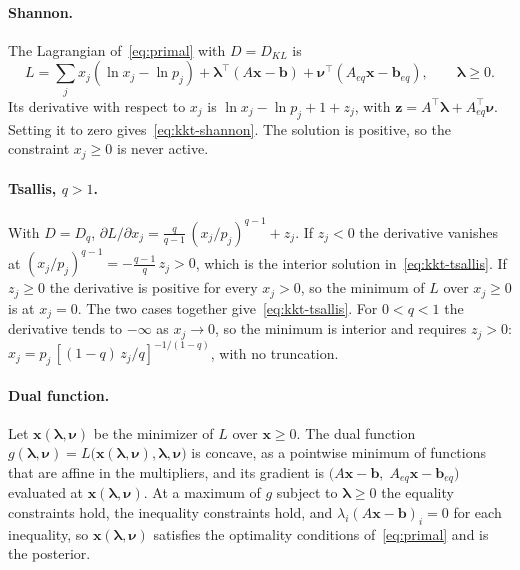 \documentclass[11pt]{article}
\newcommand{\x}{\mathbf{x}}
\begin{document}
\paragraph{Shannon.} The Lagrangian of~\eqref{eq:primal} with $D = D_{KL}$ is
\[
L = \sum_j x_j(\ln x_j - \ln p_j) + \boldsymbol{\lambda}^\top(A\x - \mathbf{b})
+ \boldsymbol{\nu}^\top(A_{eq}\x - \mathbf{b}_{eq}),
\qquad \boldsymbol{\lambda} \ge 0 .
\]
Its derivative with respect to $x_j$ is $\ln x_j - \ln p_j + 1 + z_j$, with
$\mathbf{z} = A^\top\boldsymbol{\lambda} + A_{eq}^\top\boldsymbol{\nu}$.
Setting it to zero gives~\eqref{eq:kkt-shannon}. The solution is positive,
so the constraint $x_j \ge 0$ is never active.

\paragraph{Tsallis, $q>1$.} With $D = D_q$,
$\partial L/\partial x_j = \frac{q}{q-1}\,(x_j/p_j)^{q-1} + z_j$. If
$z_j < 0$ the derivative vanishes at
$(x_j/p_j)^{q-1} = -\frac{q-1}{q}\,z_j > 0$, which is the interior solution
in~\eqref{eq:kkt-tsallis}. If $z_j \ge 0$ the derivative is positive for
every $x_j > 0$, so the minimum of $L$ over $x_j \ge 0$ is at $x_j = 0$.
The two cases together give~\eqref{eq:kkt-tsallis}. For $0<q<1$ the
derivative tends to $-\infty$ as $x_j \to 0$, so the minimum is interior
and requires $z_j > 0$:
$x_j = p_j\,[(1-q)\,z_j/q]^{-1/(1-q)}$, with no truncation.

\paragraph{Dual function.} Let
$\x(\boldsymbol{\lambda},\boldsymbol{\nu})$ be the minimizer of $L$ over
$\x \ge 0$. The dual function
$g(\boldsymbol{\lambda},\boldsymbol{\nu}) = L\big(\x(\boldsymbol{\lambda},\boldsymbol{\nu}),
\boldsymbol{\lambda},\boldsymbol{\nu}\big)$ is concave, as a pointwise minimum of
functions that are affine in the multipliers, and its gradient is
$\big(A\x - \mathbf{b},\; A_{eq}\x - \mathbf{b}_{eq}\big)$ evaluated at
$\x(\boldsymbol{\lambda},\boldsymbol{\nu})$. At a maximum of $g$ subject to
$\boldsymbol{\lambda} \ge 0$ the equality constraints hold, the inequality
constraints hold, and $\lambda_i (A\x - \mathbf{b})_i = 0$ for each
inequality, so $\x(\boldsymbol{\lambda},\boldsymbol{\nu})$ satisfies the
optimality conditions of~\eqref{eq:primal} and is the posterior.

\end{document}
